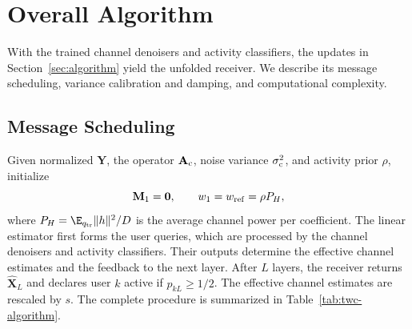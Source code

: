 \section{Overall Algorithm}
\label{sec:overall}

With the trained channel denoisers and activity classifiers, the
updates in Section~\ref{sec:algorithm} yield the unfolded receiver.
We describe its message scheduling, variance calibration and damping,
and computational complexity.

\subsection{Message Scheduling}

Given normalized $\mathbf Y$, the operator $\mathbf A_{\rm c}$,
noise variance $\sigma_{\rm c}^2$, and activity prior $\rho$,
initialize
\begin{equation}
 \mathbf M_1=\mathbf0,\qquad w_1=w_{\rm ref}=\rho P_H,
 \label{eq:twc-initialization}
\end{equation}
where $P_H=\E_{q_{\rm tr}}\|h\|^2/D$ is the average channel power
per coefficient. The linear estimator first forms the user queries,
which are processed by the channel denoisers and activity classifiers.
Their outputs determine the effective channel estimates and the
feedback to the next layer. After $L$ layers, the receiver returns
$\widehat{\mathbf X}_L$ and declares user $k$ active if $p_{kL}\geq1/2$.
The effective channel estimates are rescaled by $s$.
The complete procedure is summarized in Table~\ref{tab:twc-algorithm}.

